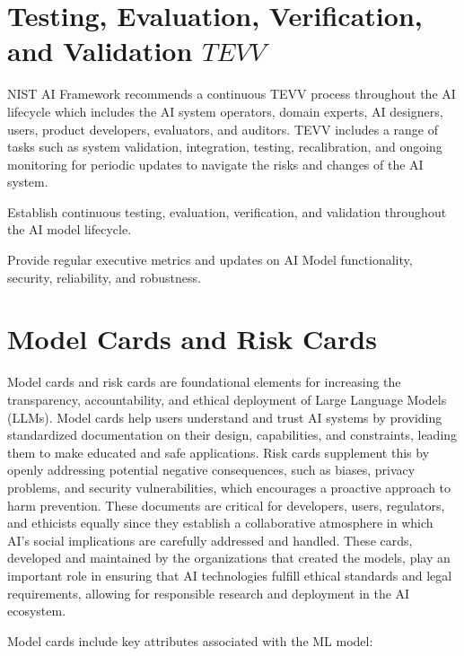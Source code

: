 \section{Testing, Evaluation, Verification, and Validation \(TEVV\)}
NIST AI Framework recommends a continuous TEVV process throughout the AI lifecycle which includes the AI system operators, domain experts, AI designers, users, product developers, evaluators, and auditors. TEVV includes a range of tasks such as system validation, integration, testing, recalibration, and ongoing monitoring for periodic updates to navigate the risks and changes of the AI system.

\begin{minipage}{\linewidth}
\begin{checklist}
  \item Establish continuous testing, evaluation, verification, and validation throughout the AI model lifecycle.
  \item Provide regular executive metrics and updates on AI Model functionality, security, reliability, and robustness.
\end{checklist}
\end{minipage}

\clearpage

\section{Model Cards and Risk Cards}
Model cards and risk cards are foundational elements for increasing the transparency, accountability, and ethical deployment of Large Language Models (LLMs). Model cards help users understand and trust AI systems by providing standardized documentation on their design, capabilities, and constraints, leading them to make educated and safe applications. Risk cards supplement this by openly addressing potential negative consequences, such as biases, privacy problems, and security vulnerabilities, which encourages a proactive approach to harm prevention. These documents are critical for developers, users, regulators, and ethicists equally since they establish a collaborative atmosphere in which AI's social implications are carefully addressed and handled. These cards, developed and maintained by the organizations that created the models, play an important role in ensuring that AI technologies fulfill ethical standards and legal requirements, allowing for responsible research and deployment in the AI ecosystem.

Model cards include key attributes associated with the ML model:

